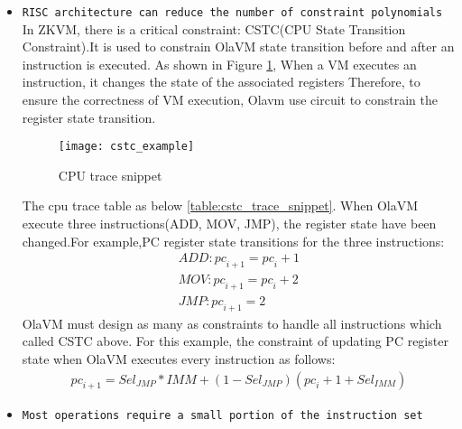 \begin{itemize}
    \item \verb|RISC architecture can reduce the number of constraint polynomials|
    In ZKVM, there is a critical constraint:  CSTC(CPU State Transition Constraint).It is used to constrain OlaVM state transition before and after an instruction is executed.
    As shown in Figure \ref{fig:cstc_example}, When a VM executes an instruction, it changes the state of the associated registers Therefore, to ensure the correctness of VM execution, Olavm use circuit to constrain the register state transition.
    \begin{figure}[!htp]
        \centering
        \texttt{[image: cstc\_example]}
        \caption{CPU trace snippet}
        \label{fig:cstc_example}
    \end{figure}
    The cpu trace table as below \ref{table:cstc_trace_snippet}. When OlaVM execute three instructions(ADD, MOV, JMP), the register state have been changed.For example,PC register state transitions for the three instructions:
    \begin{align*}
    \textit{ADD}: \textit{pc}_{i+1}  = \textit{pc}_i + 1\\
    \textit{MOV}: \textit{pc}_{i+1} = \textit{pc}_i+ 2\\
    \textit{JMP}: \textit{pc}_{i+1}=2
    \end{align*}
    OlaVM must design as many as constraints to handle all instructions which called CSTC above.
    For this example, the constraint of updating PC register state when OlaVM executes every instruction as follows:
    \begin{align*}
        \textit{pc}_{i+1}=\textit{Sel}_{\textit{JMP}}* \textit{IMM}+(1 - \textit{Sel}_{\textit{JMP}})(\textit{pc}_i + 1 + \textit{Sel}_{\textit{IMM}})
    \end{align*}
    \begin{table}[!ht]
        \caption{cpu trace table snippet}
        \label{table:cstc_trace_snippet}
    \end{table}
    \item \verb|Most operations require a small portion of the instruction set|
\end{itemize}

